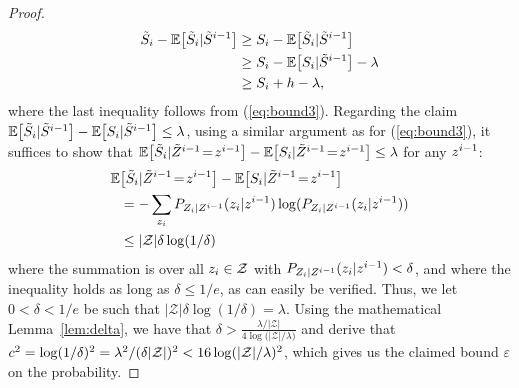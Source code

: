 \begin{proof}
\begin{align*}
\tilde{S}_i - \mathbb{E}\big[\tilde{S}_i | \tilde{S}^{i-1}\big] &\geq S_i -
\mathbb{E}\big[\tilde{S}_i | \tilde{S}^{i-1}\big]\\ 
&\geq S_i - \mathbb{E}\big[S_i | \tilde{S}^{i-1}\big] - \lambda\\
&\geq S_i + h - \lambda,
\end{align*}
where the last inequality follows from (\ref{eq:bound3}).  Regarding
the claim $\mathbb{E}\big[\tilde{S}_i | \tilde{S}^{i-1}\big]-\mathbb{E}\big[S_i
| \tilde{S}^{i-1}\big] \leq \lambda$, using a similar argument as
for (\ref{eq:bound3}), it suffices to show that $\mathbb{E}\big[\tilde{S}_i
| \tilde{Z}^{i-1}\!=\!z^{i-1}\big]-\mathbb{E}\big[S_i |
\tilde{Z}^{i-1}\!=\!z^{i-1}\big] \leq \lambda$ for any $z^{i-1}$:
\begin{align*}
\mathbb{E}&\big[\tilde{S}_i | \tilde{Z}^{i-1}\!=\!z^{i-1}\big]-
\mathbb{E}\big[S_i | \tilde{Z}^{i-1}\!=\!z^{i-1}\big]\\
  &= - \sum_{z_i} P_{Z_i |Z^{i-1}}(z_i | z^{i-1})
  \log(P_{Z_i | Z^{i-1}}(z_i | z^{i-1}))\\
  &\leq |\mathcal{Z}| \delta \log ( 1/ \delta)
\end{align*}
where the summation is over all $z_i \in \mathcal{Z}$ with $P_{Z_i | Z^{i-1}}(z_i | z^{i-1}) <
    \delta$, and 
where the inequality holds as long as $\delta \leq 1/e$, as can
easily be verified. Thus, we let $0<\delta<1/e$ be such that
$|\mathcal{Z}| \delta \log(1/\delta) = \lambda$.  Using the mathematical
Lemma~\ref{lem:delta}, we have that $\delta > \frac{\lambda /
  |\mathcal{Z}|}{4 \log{(|\mathcal{Z}| / \lambda})}$ and derive
that $c^2 = \log(1/\delta)^2 = \lambda^2/(\delta|\mathcal{Z}|)^2 < 16
\log(|\mathcal{Z}|/\lambda)^2$, which gives us the claimed bound
$\varepsilon$ on the probability.
\end{proof}

